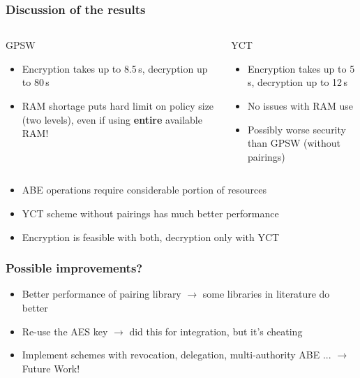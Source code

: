 \begin{frame}[t]
    \frametitle{Discussion of the results}
    \centering
    \vspace{1.5cm}
    \begin{columns}[t]
        \begin{block}{\centering GPSW}
            \begin{itemize}
                \item Encryption takes up to 8.5\,s, decryption up to 80\,s
                \item RAM shortage puts hard limit on policy size (two levels), even if using \textbf{entire} available RAM!
            \end{itemize}
        \end{block}
        \begin{block}{\centering YCT}
            \begin{itemize}
                \item Encryption takes up to 5\,s, decryption up to 12\,s
                \item No issues with RAM use
                \item Possibly worse security than GPSW (without pairings)
            \end{itemize}
        \end{block}
    \end{columns}
    \vspace{0.5cm}
    \begin{minipage}{.5\textwidth}
        \begin{itemize}
            \color{TUMOrange}
            [arrow]
            \item<2-> ABE operations require considerable portion of resources
            \item<3-> YCT scheme without pairings has much better performance
            \item<4-> Encryption is feasible with both, decryption only with YCT
        \end{itemize}
    \end{minipage}
\end{frame}

\begin{frame}[c]
    \frametitle{Possible improvements?}

    \begin{itemize}
        \pause \item Better performance of pairing library \pause \alert{$\rightarrow$ some libraries in literature do better}
        \pause \item Re-use the AES key \pause \alert{$\rightarrow$ did this for integration, but it's cheating \smiley}
        \pause \item Implement schemes with revocation, delegation, multi-authority ABE ... \pause \alert{$\rightarrow$ Future Work!}
    \end{itemize}
    

\end{frame}

